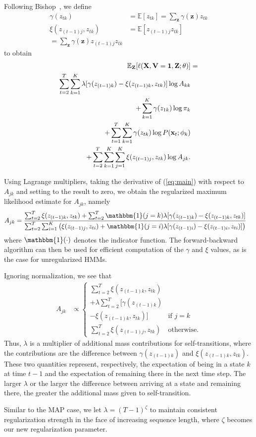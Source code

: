 Following Bishop~\cite{bishop2007pattern}, we define
\begin{align*}
    \gamma(z_{tk}) &= \mathbb{E}[z_{tk}] = \sum_{\mathbf{z}}\gamma(\mathbf{z})z_{tk} \\
    \xi(z_{(t-1)j}, z_{tk}) &= \mathbb{E}[z_{(t-1)j}z_{tk}] \\= \sum_{\mathbf{z}}\gamma(\mathbf{z})z_{(t-1)j}z_{tk}
\end{align*}
to obtain
\begin{align}\label{eq:main}
    \mathbb{E}_{\mathbf{Z}}[\ell(\mathbf{X}, \mathbf{V}=\mathbf{1}, \mathbf{Z} ; \mathbf{\theta})] 
    &= \\ \nonumber
     \sum^{T}_{t=2}\sum^{K}_{k=1}\lambda[\gamma(z_{(t-1)k})-\xi(z_{(t-1)k}, z_{tk})]\log A_{kk} \\ \nonumber
     + \sum_{k=1}^{K}\gamma(z_{1k})\log \pi_{k} \notag\\ \nonumber
    + \sum_{t=1}^{T}\sum_{k=1}^{K} \gamma(z_{tk})\log P(\mathbf{x}_t ; \mathbf{\phi}_k) \\ \nonumber
    + \sum_{t=2}^{T}\sum_{k=1}^{K}\sum_{j=1}^{K}\xi(z_{(t-1)j}, z_{tk})\log A_{jk}.
\end{align}

Using Lagrange multipliers, taking the derivative of (\ref{eq:main}) with respect to $A_{jk}$ and setting to the result to zero, we obtain the regularized maximum likelihood estimate for $A_{jk}$, namely
{\tiny
\begin{align}\label{eq:PSO-final}
    A_{jk} &= \frac{\sum_{t=2}^{T} \xi(z_{(t-1)k}, z_{tk}) + \sum_{t=2}^{T}{\mathbbm{1}(j = k)}\lambda[\gamma(z_{(t-1)k}) - \xi(z_{(t-1)k}, z_{tk})]}   
    { \sum_{t=2}^{T} \sum_{i=1}^{K} \left(\xi(z_{(t-1)j}, z_{ti}) + {\mathbbm{1}(j = i)}\lambda[\gamma(z_{(t-1)i}) - \xi(z_{(t-1)i}, z_{ti})]\right)}
\end{align}
}%
where $\mathbbm{1}(\cdot)$ denotes the indicator function. The forward-backward algorithm can then be used for efficient computation of the $\gamma$ and $\xi$ values, as is the case for unregularized HMMs.

Ignoring normalization, we see that
\begin{align*}
    A_{jk} &\propto \begin{cases} 
                \sum_{t=2}^{T} \xi(z_{(t-1)k}, z_{tk}) \\+ \lambda\sum_{t=2}^{T}[\gamma(z_{(t-1)k}) \\- \xi(z_{(t-1)k}, z_{tk})] & \mbox{if } j=k \\ 
                \sum_{t=2}^{T} \xi(z_{(t-1)j}, z_{tk}) & \mbox{otherwise.}
              \end{cases}
\end{align*}
Thus, $\lambda$ is a multiplier of additional mass contributions for self-transitions, where the contributions are the difference between $\gamma(z_{(t-1)k})$ and $\xi(z_{(t-1)k}, z_{tk})$. These two quantities represent, respectively, the expectation of being in a state $k$ at time $t-1$ and the expectation of remaining there in the next time step. The larger $\lambda$ or the larger the difference between arriving at a state and remaining there, the greater the additional mass given to self-transition. 

Similar to the MAP case, we let $\lambda = (T-1)^{\zeta}$ to maintain consistent regularization strength in the face of increasing sequence length, where $\zeta$ becomes our new regularization parameter.
